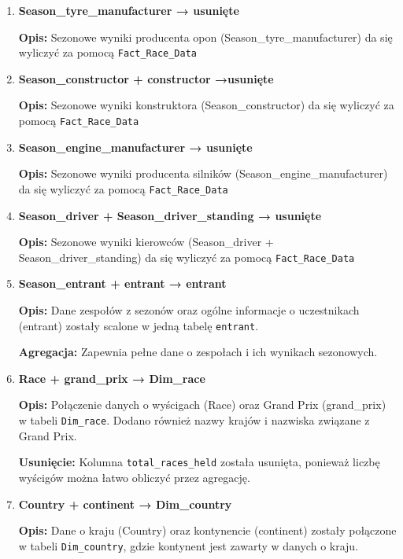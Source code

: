 \documentclass[12pt]{article}
\begin{document}
\begin{enumerate}
    \item \textbf{Season\_tyre\_manufacturer → usunięte}

    \textbf{Opis:} Sezonowe wyniki producenta opon (Season\_tyre\_manufacturer) da się wyliczyć za pomocą \texttt{Fact\_Race\_Data}

    \item \textbf{Season\_constructor + constructor →usunięte}

    \textbf{Opis:} Sezonowe wyniki konstruktora (Season\_constructor) da się wyliczyć za pomocą \texttt{Fact\_Race\_Data}


    \item \textbf{Season\_engine\_manufacturer → usunięte}

    \textbf{Opis:} Sezonowe wyniki producenta silników (Season\_engine\_manufacturer) da się wyliczyć za pomocą \texttt{Fact\_Race\_Data}

    \item \textbf{Season\_driver + Season\_driver\_standing → usunięte}

    \textbf{Opis:} Sezonowe wyniki kierowców (Season\_driver + Season\_driver\_standing) da się wyliczyć za pomocą \texttt{Fact\_Race\_Data}

    \item \textbf{Season\_entrant + entrant → entrant}

    \textbf{Opis:} Dane zespołów z sezonów oraz ogólne informacje o uczestnikach (entrant) zostały scalone w jedną tabelę \texttt{entrant}.

    \textbf{Agregacja:} Zapewnia pełne dane o zespołach i ich wynikach sezonowych.

    \item \textbf{Race + grand\_prix → Dim\_race}

    \textbf{Opis:} Połączenie danych o wyścigach (Race) oraz Grand Prix (grand\_prix) w tabeli \texttt{Dim\_race}. Dodano również nazwy krajów i nazwiska związane z Grand Prix.

    \textbf{Usunięcie:} Kolumna \texttt{total\_races\_held} została usunięta, ponieważ liczbę wyścigów można łatwo obliczyć przez agregację.

    \item \textbf{Country + continent → Dim\_country}

    \textbf{Opis:} Dane o kraju (Country) oraz kontynencie (continent) zostały połączone w tabeli \texttt{Dim\_country}, gdzie kontynent jest zawarty w danych o kraju.


\end{enumerate}
\end{document}
